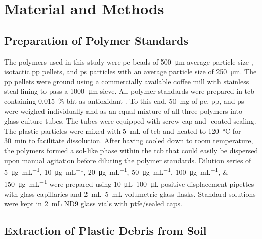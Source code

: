 \section{Material and Methods}

\subsection{Preparation of Polymer Standards}

The polymers used in this study were \ac{pe} beads of \SI{500}{\micro\meter} average particle size , isotactic \ac{pp} pellets, and \ac{ps} particles with an average particle size of \SI{250}{\micro\meter}. The \ac{pp} pellets were ground using a commercially available coffee mill with stainless steal lining to pass a \SI{1000}{\micro\meter} sieve. All polymer standards were prepared in \ac{tcb} containing \SI{0.015}{\percent} \ac{bht} as antioxidant \citep{BivensPolymertoSolvent2016}. To this end, \SI{50}{\milli\gram} of \ac{pe}, \ac{pp}, and \ac{ps} were weighed individually and as an equal mixture of all three polymers into glass culture tubes. The tubes were equipped with  screw cap and -coated sealing. The plastic particles were mixed with \SI{5}{\milli\liter} of \ac{tcb} and heated to \SI{120}{\degreeCelsius} for \SI{30}{\minute} to facilitate dissolution. After having cooled down to room temperature, the polymers formed a sol-like phase within the \ac{tcb} that could easily be dispersed upon manual agitation before diluting the polymer standards. Dilution series of \SIlist{5;10;20;50;100;150}{\micro\gram\per\milli\liter} were prepared using \SIrange{10}{100}{\micro\liter} positive displacement pipettes with glass capillaries and \SIrange{2}{5}{\milli\liter} volumetric glass flasks. Standard solutions were kept in \SI{2}{\milli\liter} ND9 glass vials with \ac{ptfe}\-/sealed caps.

\subsection{Extraction of Plastic Debris from Soil}

